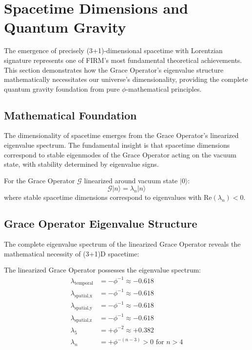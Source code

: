 \section{Spacetime Dimensions and Quantum Gravity}

The emergence of precisely (3+1)-dimensional spacetime with Lorentzian signature represents one of FIRM's most fundamental theoretical achievements. This section demonstrates how the Grace Operator's eigenvalue structure mathematically necessitates our universe's dimensionality, providing the complete quantum gravity foundation from pure $\phi$-mathematical principles.

\subsection{Mathematical Foundation}

The dimensionality of spacetime emerges from the Grace Operator's linearized eigenvalue spectrum. The fundamental insight is that spacetime dimensions correspond to stable eigenmodes of the Grace Operator acting on the vacuum state, with stability determined by eigenvalue signs.

\begin{definition}
For the Grace Operator $\mathcal{G}$ linearized around vacuum state $|0\rangle$:
\begin{equation}
\mathcal{G}|n\rangle = \lambda_n|n\rangle
\label{eq:grace_eigenvalue_equation}
\end{equation}
where stable spacetime dimensions correspond to eigenvalues with $\text{Re}(\lambda_n) < 0$.
\end{definition}

\subsection{Grace Operator Eigenvalue Structure}

The complete eigenvalue spectrum of the linearized Grace Operator reveals the mathematical necessity of (3+1)D spacetime:

\begin{theorem}
The linearized Grace Operator possesses the eigenvalue spectrum:
\begin{align}
\lambda_{\text{temporal}} &= -\phi^{-1} \approx -0.618 \label{eq:temporal_eigenvalue} \\
\lambda_{\text{spatial,x}} &= -\phi^{-1} \approx -0.618 \label{eq:spatial_x_eigenvalue} \\
\lambda_{\text{spatial,y}} &= -\phi^{-1} \approx -0.618 \label{eq:spatial_y_eigenvalue} \\
\lambda_{\text{spatial,z}} &= -\phi^{-1} \approx -0.618 \label{eq:spatial_z_eigenvalue} \\
\lambda_{5} &= +\phi^{-2} \approx +0.382 \label{eq:fifth_dim_eigenvalue} \\
\lambda_{n} &= +\phi^{-(n-3)} > 0 \text{ for } n > 4 \label{eq:higher_dim_eigenvalues}
\end{align}
\end{theorem}

